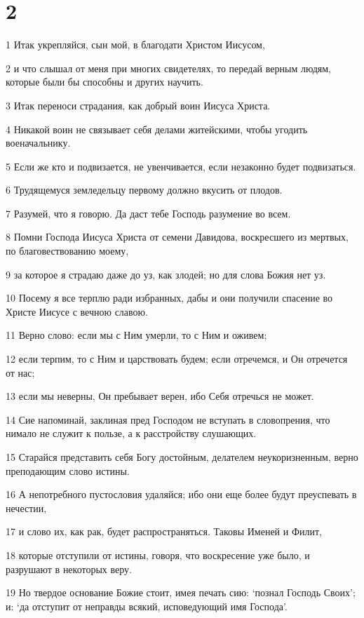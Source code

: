 \chapter{2}

\par 1 Итак укрепляйся, сын мой, в благодати Христом Иисусом,
\par 2 и что слышал от меня при многих свидетелях, то передай верным людям, которые были бы способны и других научить.
\par 3 Итак переноси страдания, как добрый воин Иисуса Христа.
\par 4 Никакой воин не связывает себя делами житейскими, чтобы угодить военачальнику.
\par 5 Если же кто и подвизается, не увенчивается, если незаконно будет подвизаться.
\par 6 Трудящемуся земледельцу первому должно вкусить от плодов.
\par 7 Разумей, что я говорю. Да даст тебе Господь разумение во всем.
\par 8 Помни Господа Иисуса Христа от семени Давидова, воскресшего из мертвых, по благовествованию моему,
\par 9 за которое я страдаю даже до уз, как злодей; но для слова Божия нет уз.
\par 10 Посему я все терплю ради избранных, дабы и они получили спасение во Христе Иисусе с вечною славою.
\par 11 Верно слово: если мы с Ним умерли, то с Ним и оживем;
\par 12 если терпим, то с Ним и царствовать будем; если отречемся, и Он отречется от нас;
\par 13 если мы неверны, Он пребывает верен, ибо Себя отречься не может.
\par 14 Сие напоминай, заклиная пред Господом не вступать в словопрения, что нимало не служит к пользе, а к расстройству слушающих.
\par 15 Старайся представить себя Богу достойным, делателем неукоризненным, верно преподающим слово истины.
\par 16 А непотребного пустословия удаляйся; ибо они еще более будут преуспевать в нечестии,
\par 17 и слово их, как рак, будет распространяться. Таковы Именей и Филит,
\par 18 которые отступили от истины, говоря, что воскресение уже было, и разрушают в некоторых веру.
\par 19 Но твердое основание Божие стоит, имея печать сию: `познал Господь Своих'; и: `да отступит от неправды всякий, исповедующий имя Господа'.
